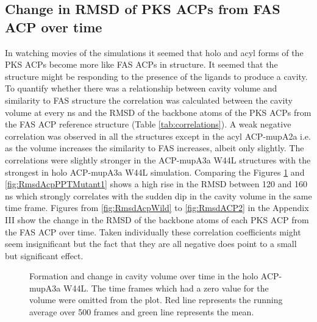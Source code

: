 	\subsection{Change in RMSD of PKS ACPs from FAS ACP over time}
	\label{sec:rmsd}
	In watching movies of the simulations it seemed that holo and acyl forms of the PKS ACPs become more like FAS ACPs in structure. It seemed that the structure might be responding to the presence of the ligands to produce a cavity. To quantify whether there was a relationship between cavity volume and similarity to FAS structure the correlation was calculated 
	between the cavity volume at every ns and the RMSD of the backbone atoms of the PKS ACPs from the FAS ACP reference structure (Table \ref{tab:correlations}). A weak negative correlation was observed in all the structures except in the acyl ACP-mupA2a i.e. as the volume increases the similarity to FAS increases, albeit only slightly. The correlations were slightly stronger in the ACP-mupA3a W44L structures with the strongest in holo ACP-mupA3a W44L simulation. Comparing the Figures \ref{fig:CavityVolumeACPPTMutant_nonzero} and \ref{fig:RmsdAcpPPTMutant1} shows a high rise in the RMSD between 120 and 160 ns which strongly correlates with the sudden dip in the cavity volume in the same time frame. Figures from \ref{fig:RmsdAcpWild} to \ref{fig:RmsdACP2} in the Appendix III show the change in the RMSD of the backbone atoms of each PKS ACP from the FAS ACP over time. Taken individually these correlation coefficients might seem insignificant but the fact that they are all negative does point to a small but significant effect.
	
		\setlength\fboxsep{5pt}
		\setlength\fboxrule{1.5pt}
		\begin{figure}[htbp]
		\centering
		\caption[Formation and change in cavity volume over time in the holo ACP-mupA3a W44L.]{Formation and change in cavity volume over time in the holo ACP-mupA3a W44L. The time frames which had a zero value for the volume were omitted from the plot. Red line represents the running average over 500 frames and green line represents the mean.}
		\label{fig:CavityVolumeACPPTMutant_nonzero}
		\end{figure}	
		
